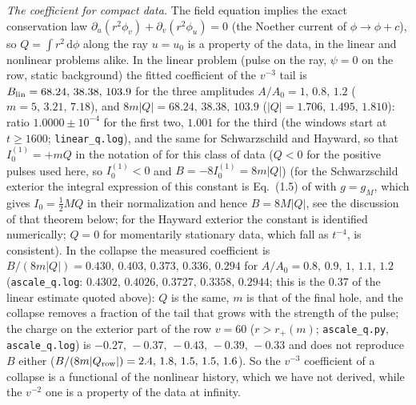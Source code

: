 \documentclass[11pt]{article}
\begin{document}
\emph{The coefficient for compact data.} The field equation implies the exact conservation law $\partial_u(r^{2}\phi_v)+\partial_v(r^{2}\phi_u)=0$ (the Noether current of $\phi\to\phi+c$), so $Q=\int r^{2}\,\mathrm d\phi$ along the ray $u=u_0$ is a property of the data, in the linear and nonlinear problems alike. In the linear problem (pulse on the ray, $\psi=0$ on the row, static background) the fitted coefficient of the $v^{-3}$ tail is $B_{\rm lin}=68.24,\,38.38,\,103.9$ for the three amplitudes $A/A_0=1,\,0.8,\,1.2$ ($m=5,\,3.21,\,7.18$), and $8m|Q|=68.24,\,38.38,\,103.9$ ($|Q|=1.706,\,1.495,\,1.810$): ratio $1.0000\pm10^{-4}$ for the first two, $1.001$ for the third (the windows start at $t\ge1600$; \texttt{linear\_q.log}), and the same for Schwarzschild and Hayward, so that $I_0^{(1)}=+mQ$ in the notation of \citet{AngelopoulosAretakisGajic2018} for this class of data ($Q<0$ for the positive pulses used here, so $I_0^{(1)}<0$ and $B=-8I_0^{(1)}=8m|Q|$) (for the Schwarzschild exterior the integral expression of this constant is Eq.~(1.5) of \citet{GajicKehrberger2025} with $g=g_M$, which gives $I_0=\tfrac12MQ$ in their normalization and hence $B=8M|Q|$, see the discussion of that theorem below; for the Hayward exterior the constant is identified numerically; $Q=0$ for momentarily stationary data, which fall as $t^{-4}$, is consistent). In the collapse the measured coefficient is $B/(8m|Q|)=0.430,\,0.403,\,0.373,\,0.336,\,0.294$ for $A/A_0=0.8,\,0.9,\,1,\,1.1,\,1.2$ (\texttt{ascale\_q.log}: $0.4302,\,0.4026,\,0.3727,\,0.3358,\,0.2944$; this is the $0.37$ of the linear estimate quoted above): $Q$ is the same, $m$ is that of the final hole, and the collapse removes a fraction of the tail that grows with the strength of the pulse; the charge on the exterior part of the row $v=60$ ($r>r_+(m)$; \texttt{ascale\_q.py}, \texttt{ascale\_q.log}) is $-0.27,\,-0.37,\,-0.43,\,-0.39,\,-0.33$ and does not reproduce $B$ either ($B/(8m|Q_{\rm row}|)=2.4,\,1.8,\,1.5,\,1.5,\,1.6$). So the $v^{-3}$ coefficient of a collapse is a functional of the nonlinear history, which we have not derived, while the $v^{-2}$ one is a property of the data at infinity.
\end{document}
